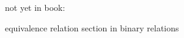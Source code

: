 \documentclass{mcs}
\begin{document}











not yet in book:





equivalence relation section in binary relations

\fi
\end{document}
